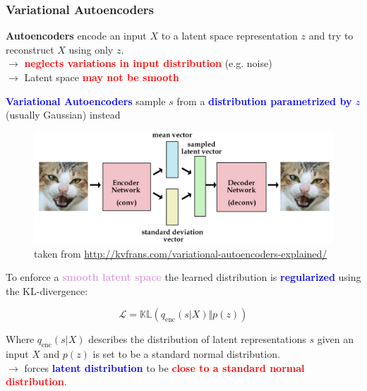 \documentclass[11pt,xcolor=dvipsnames]{beamer}
\begin{document}
\begin{frame}[allowframebreaks]
\frametitle{Variational Autoencoders}

\textbf{Autoencoders} encode an input $X$ to a latent space representation $z$ and try to reconstruct $X$ using only $z$. \\
$\rightarrow$ \textbf{\textcolor{red}{neglects variations in input distribution}} (e.g. noise) \\
$\rightarrow$ Latent space \textcolor{red}{\textbf{may not be smooth}}

\vspace{10pt}

\textbf{\textcolor{blue}{Variational Autoencoders}} sample $s$ from a \textbf{\textcolor{blue}{distribution parametrized by $z$}} (usually Gaussian) instead

\begin{figure}
\centering
\includegraphics[scale=0.15]{vae.jpg}
\caption{taken from \url{http://kvfrans.com/variational-autoencoders-explained/}}
\end{figure}

To enforce a \textcolor{Plum}{\textbf{smooth latent space}} the learned distribution is \textbf{\textcolor{blue}{regularized}} using the KL-divergence:
\vspace{10pt}

\begin{equation*}
	\mathcal{L} = \mathbb{KL}(q_{\text{enc}}(s | X) \Vert p(z))
\end{equation*}
\vspace{10pt}

Where $q_{\text{enc}}(s | X)$ describes the distribution of latent representations $s$ given an input $X$ and $p(z)$ is set to be a standard normal distribution.
\\

\vspace{10pt}
$\rightarrow$ forces \textbf{\textcolor{blue}{latent distribution}} to be \textbf{\textcolor{red}{close to a standard normal distribution}}.


\end{frame}
\end{document}
